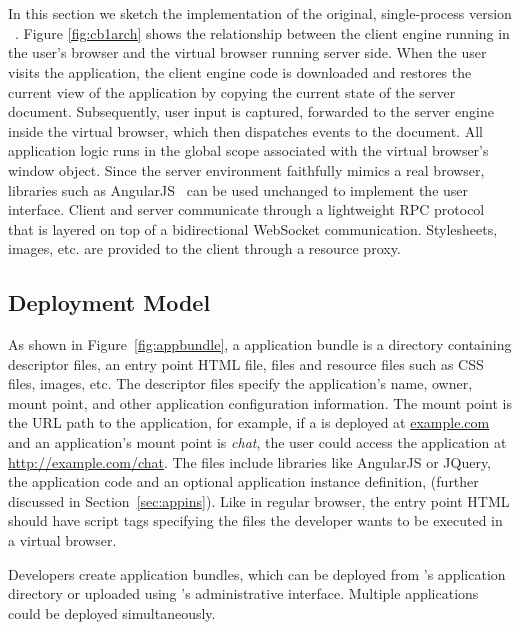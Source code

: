 \section{\cb}

\architectureoverview{}

In this section we sketch the implementation of
the original, single-process version \cb{}~\cite{mcdaniel2012cloudbrowser}.
Figure \ref{fig:cb1arch} shows the relationship
between the client engine running in the user's browser and the virtual browser
running server side.  When the user visits the application, the client engine
code is downloaded and restores the current view of the application by
copying the current state of the server document.  Subsequently, user input
is captured, forwarded to the server engine inside the virtual browser,
which then dispatches events to the document.  All application logic runs
in the global scope associated with the virtual browser's window object.
Since the server environment faithfully mimics a real browser, libraries
such as AngularJS~\cite{hevery2009angular} can be used unchanged to implement the user interface.
Client and server communicate through a lightweight RPC protocol that is
layered on top of a bidirectional WebSocket communication.
Stylesheets, images, etc. are provided to the client through a resource
proxy.

\subsection{Deployment Model}
\label{sec:deploymodel}
\appbundlefig{}
As shown in Figure~\ref{fig:appbundle}, 
a \cb application bundle is a directory
containing descriptor files, an entry point HTML file,
\js files and resource files such as CSS files, images, etc.
The descriptor files specify the application's name, owner, mount point, and
other application configuration information.
The mount point is the URL path to the application, for example,
if a \cb is deployed at \url{example.com} and an application's mount point is
\emph{chat}, the user could access the application at \url{http://example.com/chat}.
The \js files include libraries like AngularJS or JQuery, 
the application code and an optional application instance definition,
(further discussed in Section~\ref{sec:appins}).
Like in regular browser, the entry point HTML should have script tags
specifying the \js files the developer wants to be executed in a virtual browser.

Developers create application bundles, which can be deployed
from \cb's application directory or uploaded using \cb's administrative
interface.  Multiple applications could be deployed simultaneously.

